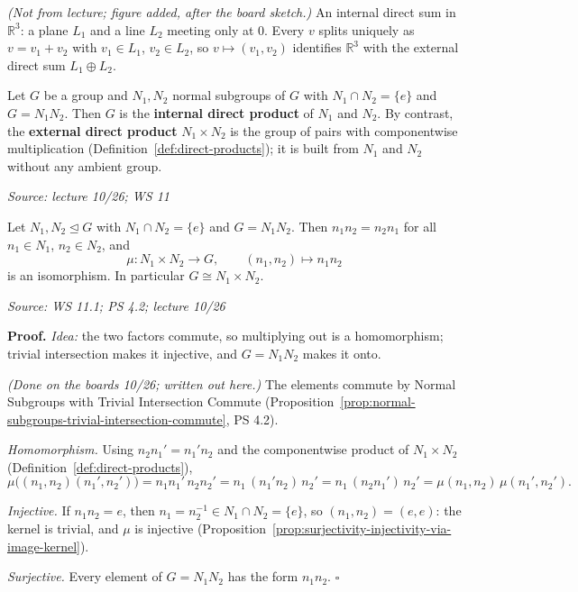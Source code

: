 \documentclass[11pt]{report}
\renewenvironment{proof}[1][Proof]{\noindent\textbf{#1.} }{\hfill$\square$\par\vspace{5pt}}
\newcommand{\srcline}[1]{\par\hfill{\footnotesize\textit{Source: #1}}}
\begin{document}
\textit{(Not from lecture; figure added, after the board sketch.)} An internal direct sum in $\mathbb{R}^3$: a plane $L_1$ and a line $L_2$ meeting only at $0$. Every $v$ splits uniquely as $v = v_1 + v_2$ with $v_1 \in L_1$, $v_2 \in L_2$, so $v \mapsto (v_1, v_2)$ identifies $\mathbb{R}^3$ with the external direct sum $L_1 \oplus L_2$.

\begin{defbox}\label{def:internal-direct-product}
Let $G$ be a group and $N_1, N_2$ normal subgroups of $G$ with $N_1 \cap N_2 = \{e\}$ and $G = N_1N_2$. Then $G$ is the \textbf{internal direct product} of $N_1$ and $N_2$. By contrast, the \textbf{external direct product} $N_1 \times N_2$ is the group of pairs with componentwise multiplication (Definition~\ref{def:direct-products}); it is built from $N_1$ and $N_2$ without any ambient group.
\srcline{lecture 10/26; WS 11}
\end{defbox}

\begin{thmbox}\label{thm:internal-direct-product}
Let $N_1, N_2 \trianglelefteq G$ with $N_1 \cap N_2 = \{e\}$ and $G = N_1N_2$. Then $n_1n_2 = n_2n_1$ for all $n_1 \in N_1$, $n_2 \in N_2$, and
\[ \mu: N_1 \times N_2 \to G, \qquad (n_1, n_2) \mapsto n_1n_2 \]
is an isomorphism. In particular $G \cong N_1 \times N_2$.
\srcline{WS 11.1; PS 4.2; lecture 10/26}
\end{thmbox}

\begin{proof}
\textit{Idea:} the two factors commute, so multiplying out is a homomorphism; trivial intersection makes it injective, and $G = N_1N_2$ makes it onto.\par
\textit{(Done on the boards 10/26; written out here.)} The elements commute by Normal Subgroups with Trivial Intersection Commute (Proposition~\ref{prop:normal-subgroups-trivial-intersection-commute}, PS 4.2).

\emph{Homomorphism.} Using $n_2 n_1' = n_1' n_2$ and the componentwise product of $N_1 \times N_2$ (Definition~\ref{def:direct-products}),
\[ \mu\big((n_1, n_2)(n_1', n_2')\big) = n_1n_1'\,n_2n_2' = n_1\,(n_1'n_2)\,n_2' = n_1\,(n_2n_1')\,n_2' = \mu(n_1, n_2)\,\mu(n_1', n_2'). \]

\emph{Injective.} If $n_1n_2 = e$, then $n_1 = n_2^{-1} \in N_1 \cap N_2 = \{e\}$, so $(n_1, n_2) = (e, e)$: the kernel is trivial, and $\mu$ is injective (Proposition~\ref{prop:surjectivity-injectivity-via-image-kernel}).

\emph{Surjective.} Every element of $G = N_1N_2$ has the form $n_1n_2$.
\end{proof}
\end{document}

